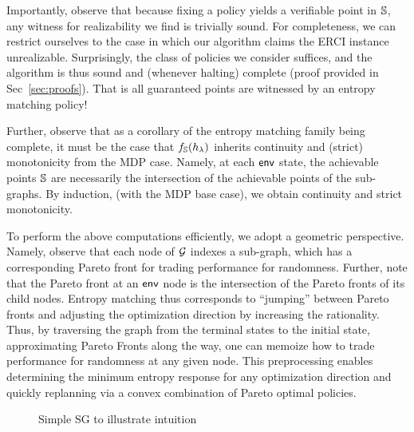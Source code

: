 Importantly, observe that because
fixing a policy yields a verifiable point in $\mathbb{S}$, any witness
for realizability we find is trivially sound. For completeness, we can
restrict ourselves to the case in which our algorithm claims the ERCI
instance unrealizable. Surprisingly, the class of policies we consider
suffices, and the algorithm is thus sound and (whenever halting)
complete (proof provided in Sec~\ref{sec:proofs}). That is all
guaranteed points are witnessed by an entropy matching policy!

Further, observe that as a corollary of the entropy matching family
being complete, it must be the case that $f_\mathbb{S}(h_\lambda)$
inherits continuity and (strict) monotonicity from the MDP
case. Namely, at each $\mathsf{env}$ state, the achievable points
$\mathbb{S}$ are necessarily the intersection of the achievable points
of the sub-graphs. By induction, (with the MDP base case), we obtain
continuity and strict monotonicity.

 To perform the above computations
efficiently, we adopt a geometric perspective. Namely, observe that
each node of $\mathcal{G}$ indexes a sub-graph, which has a corresponding
Pareto front for trading performance for randomness. Further, note
that the Pareto front at an $\mathsf{env}$ node is the intersection of the
Pareto fronts of its child nodes. Entropy matching thus corresponds to
``jumping'' between Pareto fronts and adjusting the optimization
direction by increasing the rationality.   Thus, by traversing the graph from the terminal states to
the initial state, approximating Pareto Fronts along the way, one can memoize
how to trade performance for randomness at any given node. This
preprocessing enables determining the minimum entropy response for any
optimization direction and quickly replanning via a convex combination
of Pareto optimal policies.



\begin{figure}[h]
\centering
\scalebox{0.8}{

}
\caption{Simple SG to illustrate intuition}
\label{fig:sg:simplest}
\end{figure}

